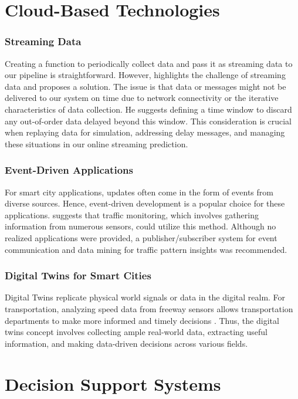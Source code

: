 \section{Cloud-Based Technologies}
\label{sec:cloud-based_technologies}
\subsubsection{Streaming Data}
Creating a function to periodically collect data and pass it as streaming data to our pipeline is straightforward. However, \cite{damji2020learning} highlights the challenge of streaming data and proposes a solution. The issue is that data or messages might not be delivered to our system on time due to network connectivity or the iterative characteristics of data collection. He suggests defining a time window to discard any out-of-order data delayed beyond this window. This consideration is crucial when replaying data for simulation, addressing delay messages, and managing these situations in our online streaming prediction.

\subsubsection{Event-Driven Applications}
For smart city applications, updates often come in the form of events from diverse sources. Hence, event-driven development is a popular choice for these applications. \cite{hinze2009event} suggests that traffic monitoring, which involves gathering information from numerous sensors, could utilize this method. Although no realized applications were provided, a publisher/subscriber system for event communication and data mining for traffic pattern insights was recommended.

\subsubsection{Digital Twins for Smart Cities}
Digital Twins replicate physical world signals or data in the digital realm. For transportation, analyzing speed data from freeway sensors allows transportation departments to make more informed and timely decisions \cite{hu2021digital}. Thus, the digital twins concept involves collecting ample real-world data, extracting useful information, and making data-driven decisions across various fields.

\section{Decision Support Systems}
\label{sec:decision_support_systems}
